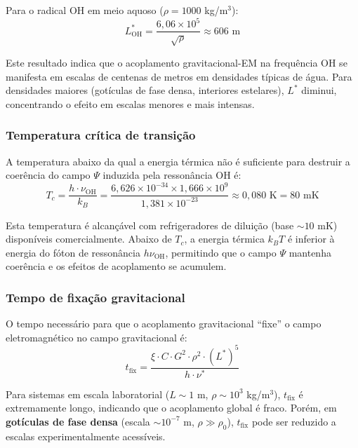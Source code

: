 \documentclass[12pt,a4paper]{article}
\newcommand{\nuOH}{\nu_{\text{OH}}}
\newcommand{\tfix}{t_{\text{fix}}}
\newcommand{\Tcrit}{T_c}
\begin{document}
Para o radical OH em meio aquoso ($\rho = 1000$ kg/m$^3$):
\begin{equation}
L^*_{\text{OH}} = \frac{6{,}06 \times 10^5}{\sqrt{\rho}}
  \approx 606 \text{ m}
\label{eq:escala_oh}
\end{equation}

Este resultado indica que o acoplamento gravitacional-EM na
frequência OH se manifesta em escalas de centenas de metros em
densidades típicas de água. Para densidades maiores (gotículas
de fase densa, interiores estelares), $L^*$ diminui,
concentrando o efeito em escalas menores e mais intensas.

\subsubsection{Temperatura crítica de transição}

A temperatura abaixo da qual a energia térmica não é suficiente
para destruir a coerência do campo $\Psi$ induzida pela
ressonância OH é:
\begin{equation}
\Tcrit = \frac{h \cdot \nuOH}{k_B} =
  \frac{6{,}626 \times 10^{-34} \times 1{,}666 \times 10^9}
  {1{,}381 \times 10^{-23}} \approx 0{,}080 \text{ K}
  = 80 \text{ mK}
\label{eq:tc}
\end{equation}

Esta temperatura é alcançável com refrigeradores de diluição
(base $\sim 10$ mK) disponíveis comercialmente. Abaixo de
$\Tcrit$, a energia térmica $k_B T$ é inferior à energia do
fóton de ressonância $h\nuOH$, permitindo que o campo $\Psi$
mantenha coerência e os efeitos de acoplamento se acumulem.

\subsubsection{Tempo de fixação gravitacional}

O tempo necessário para que o acoplamento gravitacional ``fixe''
o campo eletromagnético no campo gravitacional é:
\begin{equation}
\tfix = \frac{\xi \cdot C \cdot G^2 \cdot \rho^2 \cdot
  (L^*)^5}{h \cdot \nu^*}
\label{eq:tfix}
\end{equation}

Para sistemas em escala laboratorial ($L \sim 1$ m,
$\rho \sim 10^3$ kg/m$^3$), $\tfix$ é extremamente longo,
indicando que o acoplamento global é fraco. Porém, em
\textbf{gotículas de fase densa} (escala $\sim 10^{-7}$ m,
$\rho \gg \rho_0$), $\tfix$ pode ser reduzido a escalas
experimentalmente acessíveis.
\end{document}
